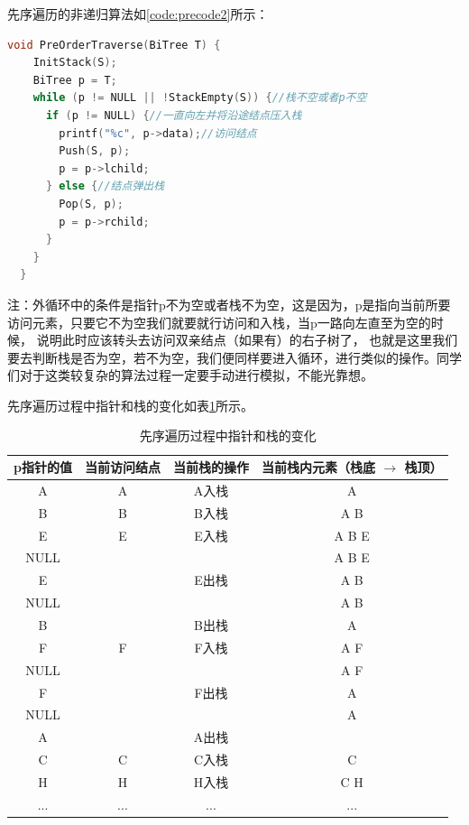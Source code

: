 \documentclass[lang=cn,newtx,10pt,scheme=chinese]{../elegantbook}
\begin{document}
先序遍历的非递归算法如\ref{code:precode2}所示：

\begin{lstlisting}[language=C++, caption={先序遍历}, label={code:precode2}]
  void PreOrderTraverse(BiTree T) {
    InitStack(S);
    BiTree p = T;
    while (p != NULL || !StackEmpty(S)) {//栈不空或者p不空
      if (p != NULL) {//一直向左并将沿途结点压入栈
        printf("%c", p->data);//访问结点
        Push(S, p);
        p = p->lchild;
      } else {//结点弹出栈
        Pop(S, p);
        p = p->rchild;
      }
    }
  }
\end{lstlisting}

注：外循环中的条件是指针p不为空或者栈不为空，这是因为，p是指向当前所要访问元素，只要它不为空我们就要就行访问和入栈，当p一路向左直至为空的时候，
说明此时应该转头去访问双亲结点（如果有）的右子树了，
也就是这里我们要去判断栈是否为空，若不为空，我们便同样要进入循环，进行类似的操作。同学们对于这类较复杂的算法过程一定要手动进行模拟，不能光靠想。

先序遍历过程中指针和栈的变化如表\ref{tab:preorder_stack}所示。

\begin{table}[!htbp]
  \centering
  \caption{先序遍历过程中指针和栈的变化}
  \begin{tabular}{|c|c|c|c|}
  \hline
  \textbf{p指针的值} & \textbf{当前访问结点} & \textbf{当前栈的操作} & \textbf{当前栈内元素（栈底 $\to$ 栈顶）} \\ \hline
  A & A & A入栈 & A \\ \hline
  B & B & B入栈 & A B \\ \hline
  E & E & E入栈 & A B E \\ \hline
  NULL &  &  & A B E \\ \hline
  E &  & E出栈 & A B \\ \hline
  NULL &  &  & A B \\ \hline
  B &  & B出栈 & A \\ \hline
  F & F & F入栈 & A F \\ \hline
  NULL &  &  & A F \\ \hline
  F &  & F出栈 & A \\ \hline
  NULL &  &  & A \\ \hline
  A &  & A出栈 &  \\ \hline
  C & C & C入栈 & C \\ \hline
  H & H & H入栈 & C H \\ \hline
  ... & ... & ... & ... \\ \hline
  \end{tabular}
  \label{tab:preorder_stack}
  \end{table}
\end{document}
